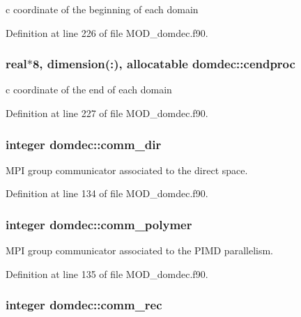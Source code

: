 c coordinate of the beginning of each domain 



Definition at line 226 of file M\-O\-D\-\_\-domdec.\-f90.

\hypertarget{classdomdec_a50ae6442cb7d2c0f772f728601e5efbc}{
\subsubsection[{cendproc}]{\setlength{\rightskip}{0pt plus 5cm}real$\ast$8, dimension(\-:), allocatable domdec\-::cendproc}}\label{classdomdec_a50ae6442cb7d2c0f772f728601e5efbc}


c coordinate of the end of each domain 



Definition at line 227 of file M\-O\-D\-\_\-domdec.\-f90.

\hypertarget{classdomdec_a383993116087900b4f889f3f077dc01d}{
\subsubsection[{comm\-\_\-dir}]{\setlength{\rightskip}{0pt plus 5cm}integer domdec\-::comm\-\_\-dir}}\label{classdomdec_a383993116087900b4f889f3f077dc01d}


M\-P\-I group communicator associated to the direct space. 



Definition at line 134 of file M\-O\-D\-\_\-domdec.\-f90.

\hypertarget{classdomdec_ad5faf93f8356aea734a9ed5012fb597b}{
\subsubsection[{comm\-\_\-polymer}]{\setlength{\rightskip}{0pt plus 5cm}integer domdec\-::comm\-\_\-polymer}}\label{classdomdec_ad5faf93f8356aea734a9ed5012fb597b}


M\-P\-I group communicator associated to the P\-I\-M\-D parallelism. 



Definition at line 135 of file M\-O\-D\-\_\-domdec.\-f90.

\hypertarget{classdomdec_a046ed439b4f62f80be0e38736896da25}{
\subsubsection[{comm\-\_\-rec}]{\setlength{\rightskip}{0pt plus 5cm}integer domdec\-::comm\-\_\-rec}}\label{classdomdec_a046ed439b4f62f80be0e38736896da25}


